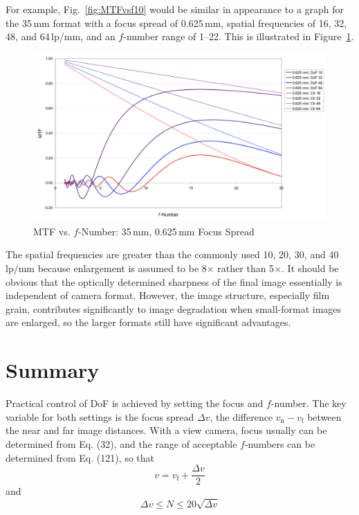 \documentclass[11pt, oneside]{scrartcl}   	%
\newcommand{\Dv}{\ensuremath{\Delta v}}
\begin{document}
For example, Fig.~\ref{fig:MTFvsf10} would be similar in appearance to a graph for the 35\,mm format with a focus spread of 0.625\,mm, spatial frequencies of 16, 32, 48, and 64\,lp/mm, and an $f$-number range of 1--22. This is illustrated in Figure~\ref{fig:MTFvsf35}.

\begin{figure}[htbp] %
   \centering
   \includegraphics[width=\linewidth]{figure/fig_dofd_16} 
   \caption{MTF vs. $f$-Number: 35\,mm, 0.625\,mm Focus Spread}
   \label{fig:MTFvsf35}
\end{figure}

The spatial frequencies are greater than the commonly used 10, 20, 30, and 40\,lp/mm because enlargement is assumed to be 8$\times$ rather than 5$\times$.
It should be obvious that the optically determined sharpness of the final image essentially is independent of camera format. However, the image structure, especially film grain, contributes significantly to image degradation when small-format images are enlarged, so the larger formats still have significant advantages.

\section{Summary}

Practical control of DoF is achieved by setting the focus and $f$-number. The key variable for both settings is the focus spread $\Dv$, the difference $v_\mathrm{n} - v_\mathrm{f}$ between the near and far image distances. With a view camera, focus usually can be determined from Eq. (32), and the range of acceptable $f$-numbers can be determined from Eq. (121), so that
\begin{equation}
v = v_\mathrm{f} +\frac{\Dv}2
\end{equation}
and
\begin{equation}
\Dv \leq N \leq 20\sqrt{\Dv}
\end{equation}
\end{document}
